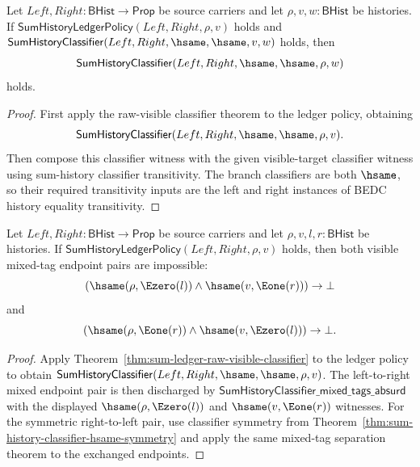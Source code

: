 \begin{theorem}
\label{thm:sum-ledger-classifier-extension}
Let $Left,Right:\mathsf{BHist}\to\mathsf{Prop}$ be source carriers and let
$\rho,v,w:\mathsf{BHist}$ be histories. If
$\mathsf{SumHistoryLedgerPolicy}(Left,Right,\rho,v)$ holds and
$\mathsf{SumHistoryClassifier}(Left,Right,\hsame,\hsame,v,w)$ holds, then
$$
\mathsf{SumHistoryClassifier}(Left,Right,\hsame,\hsame,\rho,w)
$$
holds.
\end{theorem}
\begin{proof}
First apply the raw-visible classifier theorem to the ledger policy, obtaining
$$
\mathsf{SumHistoryClassifier}(Left,Right,\hsame,\hsame,\rho,v).
$$
Then compose this classifier witness with the given visible-target classifier
witness using sum-history classifier transitivity. The branch classifiers are
both $\hsame$, so their required transitivity inputs are the left and right
instances of BEDC history equality transitivity.
\end{proof}

\begin{theorem}
\label{thm:sum-ledger-visible-tag-separation}
Let $Left,Right:\mathsf{BHist}\to\mathsf{Prop}$ be source carriers and let
$\rho,v,l,r:\mathsf{BHist}$ be histories. If
$\mathsf{SumHistoryLedgerPolicy}(Left,Right,\rho,v)$ holds, then both visible
mixed-tag endpoint pairs are impossible:
$$
(\hsame(\rho,\Ezero(l))\land \hsame(v,\Eone(r)))\to\bot
$$
and
$$
(\hsame(\rho,\Eone(r))\land \hsame(v,\Ezero(l)))\to\bot.
$$
\end{theorem}
\begin{proof}
Apply Theorem~\ref{thm:sum-ledger-raw-visible-classifier} to the ledger policy
to obtain
$\mathsf{SumHistoryClassifier}(Left,Right,\hsame,\hsame,\rho,v)$. The
left-to-right mixed endpoint pair is then discharged by
$\mathsf{SumHistoryClassifier\_mixed\_tags\_absurd}$ with the displayed
$\hsame(\rho,\Ezero(l))$ and $\hsame(v,\Eone(r))$ witnesses. For the symmetric
right-to-left pair, use classifier symmetry from
Theorem~\ref{thm:sum-history-classifier-hsame-symmetry} and apply the same mixed-tag
separation theorem to the exchanged endpoints.
\end{proof}

